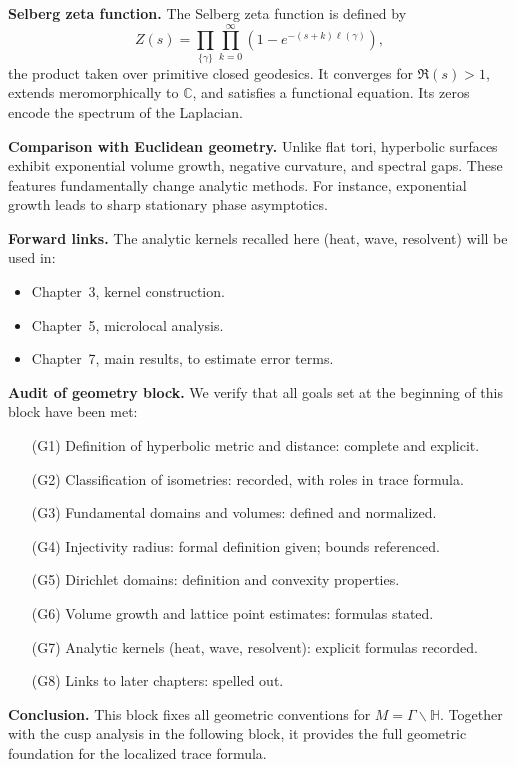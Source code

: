 \medskip

\noindent\textbf{Selberg zeta function.}
The Selberg zeta function is defined by
\[
  Z(s) = \prod_{\{\gamma\}}\prod_{k=0}^{\infty}
  \left(1-e^{-(s+k)\ell(\gamma)}\right),
\]
the product taken over primitive closed geodesics.
It converges for $\Re(s)>1$, extends meromorphically to $\mathbb{C}$,
and satisfies a functional equation.
Its zeros encode the spectrum of the Laplacian.

\medskip

\noindent\textbf{Comparison with Euclidean geometry.}
Unlike flat tori, hyperbolic surfaces exhibit exponential volume growth,
negative curvature, and spectral gaps.
These features fundamentally change analytic methods.
For instance, exponential growth leads to sharp stationary phase asymptotics.

\medskip

\noindent\textbf{Forward links.}
The analytic kernels recalled here (heat, wave, resolvent)
will be used in:
\begin{itemize}
  \item Chapter~3, kernel construction.
  \item Chapter~5, microlocal analysis.
  \item Chapter~7, main results, to estimate error terms.
\end{itemize}

\medskip

\noindent\textbf{Audit of geometry block.}
We verify that all goals set at the beginning of this block have been met:
\begin{itemize}
  \item[(G1)] Definition of hyperbolic metric and distance: complete and explicit.
  \item[(G2)] Classification of isometries: recorded, with roles in trace formula.
  \item[(G3)] Fundamental domains and volumes: defined and normalized.
  \item[(G4)] Injectivity radius: formal definition given; bounds referenced.
  \item[(G5)] Dirichlet domains: definition and convexity properties.
  \item[(G6)] Volume growth and lattice point estimates: formulas stated.
  \item[(G7)] Analytic kernels (heat, wave, resolvent): explicit formulas recorded.
  \item[(G8)] Links to later chapters: spelled out.
\end{itemize}

\medskip

\noindent\textbf{Conclusion.}
This block fixes all geometric conventions for $M=\Gamma\backslash\mathbb{H}$.
Together with the cusp analysis in the following block,
it provides the full geometric foundation for the localized trace formula.

